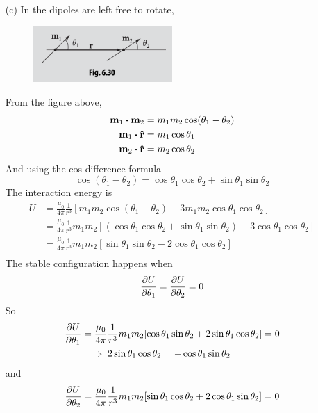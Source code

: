 \documentclass[../main.tex]{subfiles}
\begin{document}
\begin{itemize}
    \item [(c)] In the dipoles are left free to rotate,
    \begin{figure}[ht]
        \centering
        \includegraphics[width=0.5\textwidth]{hw11_1.png}
    \end{figure}
    From the figure above,
    \begin{align*}
        \vb m_1 \vdot \vb m_2 &= m_1 m_2 \cos(\theta_1 - \theta_2) \\
        \vb m_1 \vdot \vu r &= m_1 \cos \theta_1 \\
        \vb m_2 \vdot \vu r &= m_2 \cos \theta_2
    \end{align*}
    And using the cos difference formula
    \[\cos(\theta_1 - \theta_2) = \cos \theta_1 \cos \theta_2 + \sin \theta_1 \sin \theta_2\]
    The interaction energy is
    \begin{align*}
        U &= \frac{\mu_0}{4\pi} \frac{1}{r^3} [m_1 m_2 \cos(\theta_1 - \theta_2) - 3 m_1 m_2 \cos \theta_1 \cos \theta_2] \\
        &= \frac{\mu_0}{4\pi} \frac{1}{r^3} m_1 m_2
            [(\cos\theta_1 \cos\theta_2 + \sin\theta_1 \sin\theta_2) - 3 \cos \theta_1 \cos \theta_2] \\
        &= \frac{\mu_0}{4\pi} \frac{1}{r^3} m_1 m_2
            [\sin\theta_1 \sin\theta_2 - 2 \cos \theta_1 \cos \theta_2] \\
    \end{align*}
    The stable configuration happens when 
    \begin{align*}
        \pdv{U}{\theta_1} = \pdv{U}{\theta_2} = 0
    \end{align*}
    So
    \begin{align*}
        \pdv{U}{\theta_1} &= \frac{\mu_0}{4\pi} \frac{1}{r^3} m_1 m_2
            [\cos\theta_1 \sin\theta_2 + 2 \sin \theta_1 \cos \theta_2] = 0 \\
            &\implies 2\sin\theta_1 \cos\theta_2 = - \cos\theta_1 \sin\theta_2
    \end{align*}
    and
    \begin{align*}
        \pdv{U}{\theta_2} &= \frac{\mu_0}{4\pi} \frac{1}{r^3} m_1 m_2
            [\sin\theta_1 \cos\theta_2 + 2 \cos \theta_1 \sin \theta_2] = 0 \\

\end{align*}
\end{itemize}
\end{document}

